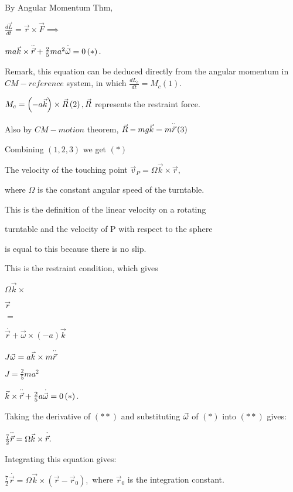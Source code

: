 \documentclass{article}
\begin{document}
By Angular Momentum Thm$,$

$\frac{d\vec{L}}{dt}=\vec{r}\times \vec{F}\implies $

$ma\vec{k}\times \overset{\cdot \cdot }{\vec{r}}+\frac{2}{5}ma^{2}\overset{%
\cdot }{\vec{\omega}}=0\left( \ast \right) .$

Remark, this equation can be deduced directly from the angular momentum in $%
CM-reference$ system, in which $\frac{dL_{c}}{dt}=M_{c}\left( 1\right) .$

$\bigskip M_{c}=\left( -a\vec{k}\right) \times \vec{R}\left( 2\right) ,\vec{R%
}$ represents the restraint force.

Also by $CM-motion$ theorem, $\vec{R}-mg\vec{k}=m\overset{\cdot \cdot }{\vec{%
r}}\left( 3\right) $

Combining $\left( 1,2,3\right) $ we get $\left( \ast \right) $

The velocity of the touching point $\vec{v}_{P}=\Omega \vec{k}\times \vec{r},
$

where $\Omega $ is the constant angular speed of the turntable. 

This is the definition of the linear velocity on a rotating 

turntable and the velocity of P with respect to the sphere 

is equal to this because there is no slip. 

This is the restraint condition, which gives

$\Omega \vec{k}\times $

$\vec{r}$

$=$

$\overset{\cdot }{\vec{r}}+\vec{\omega}\times \left( -a\right) \vec{k}$

$\bigskip J\vec{\omega}=a\vec{k}\times m\overset{\cdot \cdot }{\vec{r}}$

$J=\frac{2}{5}ma^{2}$

$\vec{k}\times \overset{\cdot \cdot }{\vec{r}}+\frac{2}{5}a\overset{\cdot }{%
\vec{\omega}}=0\left( \ast \right) .$

Taking the derivative of $\left( \ast \ast \right) $ and substituting $\vec{%
\omega}$ of $\left( \ast \right) $ into $\left( \ast \ast \right) $ gives:

$\frac{7}{2}\overset{\cdot \cdot }{\vec{r}}=\Omega \vec{k}\times \overset{%
\cdot }{\vec{r}}.$

Integrating this equation gives:

$\frac{7}{2}\overset{\cdot }{\vec{r}}=\Omega \vec{k}\times \left( \vec{r}-%
\vec{r}_{0}\right) ,$ where $\vec{r}_{0}$ is the integration constant.
\end{document}
